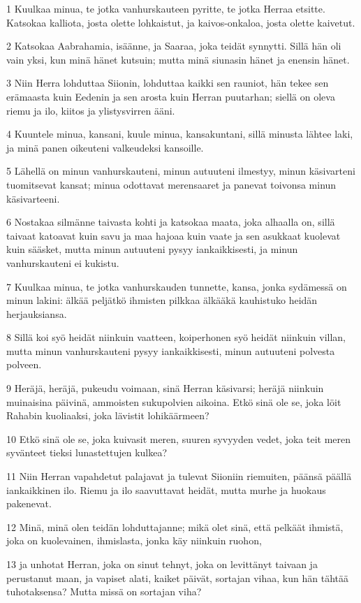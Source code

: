\par 1 Kuulkaa minua, te jotka vanhurskauteen pyritte, te jotka Herraa etsitte. Katsokaa kalliota, josta olette lohkaistut, ja kaivos-onkaloa, josta olette kaivetut.
\par 2 Katsokaa Aabrahamia, isäänne, ja Saaraa, joka teidät synnytti. Sillä hän oli vain yksi, kun minä hänet kutsuin; mutta minä siunasin hänet ja enensin hänet.
\par 3 Niin Herra lohduttaa Siionin, lohduttaa kaikki sen rauniot, hän tekee sen erämaasta kuin Eedenin ja sen arosta kuin Herran puutarhan; siellä on oleva riemu ja ilo, kiitos ja ylistysvirren ääni.
\par 4 Kuuntele minua, kansani, kuule minua, kansakuntani, sillä minusta lähtee laki, ja minä panen oikeuteni valkeudeksi kansoille.
\par 5 Lähellä on minun vanhurskauteni, minun autuuteni ilmestyy, minun käsivarteni tuomitsevat kansat; minua odottavat merensaaret ja panevat toivonsa minun käsivarteeni.
\par 6 Nostakaa silmänne taivasta kohti ja katsokaa maata, joka alhaalla on, sillä taivaat katoavat kuin savu ja maa hajoaa kuin vaate ja sen asukkaat kuolevat kuin sääsket, mutta minun autuuteni pysyy iankaikkisesti, ja minun vanhurskauteni ei kukistu.
\par 7 Kuulkaa minua, te jotka vanhurskauden tunnette, kansa, jonka sydämessä on minun lakini: älkää peljätkö ihmisten pilkkaa älkääkä kauhistuko heidän herjauksiansa.
\par 8 Sillä koi syö heidät niinkuin vaatteen, koiperhonen syö heidät niinkuin villan, mutta minun vanhurskauteni pysyy iankaikkisesti, minun autuuteni polvesta polveen.
\par 9 Heräjä, heräjä, pukeudu voimaan, sinä Herran käsivarsi; heräjä niinkuin muinaisina päivinä, ammoisten sukupolvien aikoina. Etkö sinä ole se, joka löit Rahabin kuoliaaksi, joka lävistit lohikäärmeen?
\par 10 Etkö sinä ole se, joka kuivasit meren, suuren syvyyden vedet, joka teit meren syvänteet tieksi lunastettujen kulkea?
\par 11 Niin Herran vapahdetut palajavat ja tulevat Siioniin riemuiten, päänsä päällä iankaikkinen ilo. Riemu ja ilo saavuttavat heidät, mutta murhe ja huokaus pakenevat.
\par 12 Minä, minä olen teidän lohduttajanne; mikä olet sinä, että pelkäät ihmistä, joka on kuolevainen, ihmislasta, jonka käy niinkuin ruohon,
\par 13 ja unhotat Herran, joka on sinut tehnyt, joka on levittänyt taivaan ja perustanut maan, ja vapiset alati, kaiket päivät, sortajan vihaa, kun hän tähtää tuhotaksensa? Mutta missä on sortajan viha?
